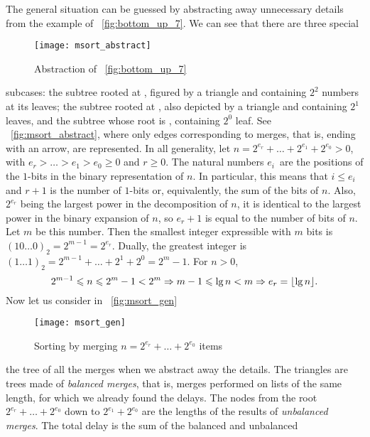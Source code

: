 The general situation can be guessed by abstracting away unnecessary
details from the example of \fig~\vref{fig:bottom_up_7}. We can see
that there are three special
\begin{figure}[t]
\centering
\texttt{[image: msort\_abstract]}
\caption{Abstraction of \fig~\vref{fig:bottom_up_7}
\label{fig:msort_abstract}}
\end{figure}
sub\-cases: the subtree rooted at \erlcode{[1,3,5,7]}, figured by a
triangle and containing \(2^2\) numbers at its leaves; the subtree
rooted at \erlcode{[2,6]}, also depicted by a triangle and containing
\(2^1\) leaves, and the subtree whose root is \erlcode{[4]},
containing \(2^0\) leaf. See \fig~\vref{fig:msort_abstract}, where
only edges corresponding to merges, that is, ending with an arrow, are
represented. In all generality, let \(n=2^{e_r} + \dots + 2^{e_1} +
2^{e_0} > 0\), with \(e_r > \dots > e_1 > e_0 \geqslant 0\) and \(r
\geqslant 0\). The natural numbers \(e_i\)~are the positions of the
\(1\)\hyp{}bits in the binary representation of \(n\). In particular,
this means that \(i \leqslant e_i\) and \(r+1\) is the number of
\(1\)\hyp{}bits or, equivalently, the sum of the bits of \(n\). Also,
\(2^{e_r}\) being the largest power in the decomposition of \(n\), it
is identical to the largest power in the binary expansion of \(n\), so
\(e_r+1\) is equal to the number of bits of \(n\). Let \(m\) be this
number. Then the smallest integer expressible with \(m\) bits is \((10
\ldots 0)_2 = 2^{m-1} = 2^{e_r}\). Dually, the greatest integer is
\((1 \ldots 1)_2 = 2^{m-1}+\dots+2^1+2^0 = 2^{m}-1\). For \(n > 0\),
\begin{equation}
2^{m-1} \leqslant n \leqslant 2^m -  1 
< 2^m \Rightarrow m - 1 \leqslant \lg n
< m \Rightarrow e_r = \lfloor{\lg n}\rfloor.\label{eq:e_r}
\end{equation}
Now let us consider in \fig~\vref{fig:msort_gen}
\begin{figure}[!b]
\centering
\texttt{[image: msort\_gen]}
\caption{Sorting by merging \(n=2^{e_r}+ \dots + 2^{e_0}\) items
\label{fig:msort_gen}}
\end{figure}
the tree of all the merges when we abstract away the details. The
triangles are trees made of \emph{balanced merges}, that is, merges
performed on lists of the same length, for which we already found the
delays. The nodes from the root \(2^{e_r}+\dots+2^{e_0}\) down to
\(2^{e_1}+2^{e_0}\) are the lengths of the results of \emph{unbalanced
  merges}. The total delay is the sum of the balanced and unbalanced

